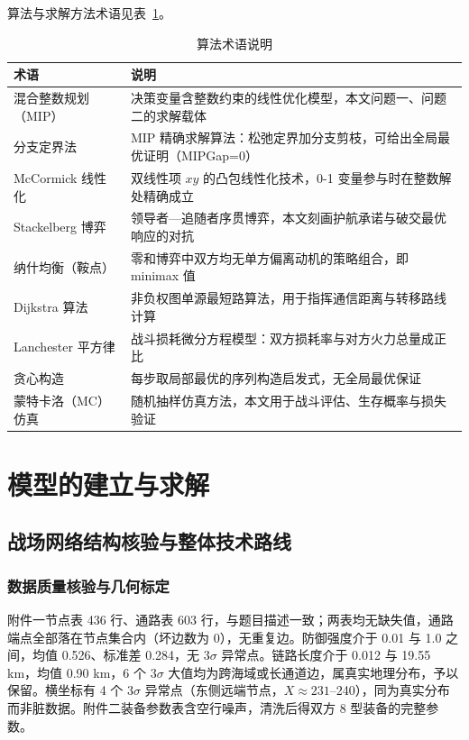 \documentclass[12pt,a4paper]{ctexart}
\begin{document}
算法与求解方法术语见表~\ref{tab:algo}。

\begin{table}[H]
\centering
\caption{算法术语说明}
\label{tab:algo}
\begin{tabular}{p{3.6cm}p{10.0cm}}
\toprule
术语 & 说明 \\
\midrule
混合整数规划（MIP） & 决策变量含整数约束的线性优化模型，本文问题一、问题二的求解载体 \\
分支定界法 & MIP 精确求解算法：松弛定界加分支剪枝，可给出全局最优证明（MIPGap=0） \\
McCormick 线性化 & 双线性项 $xy$ 的凸包线性化技术，0-1 变量参与时在整数解处精确成立 \\
Stackelberg 博弈 & 领导者—追随者序贯博弈，本文刻画护航承诺与破交最优响应的对抗 \\
纳什均衡（鞍点） & 零和博弈中双方均无单方偏离动机的策略组合，即 minimax 值 \\
Dijkstra 算法 & 非负权图单源最短路算法，用于指挥通信距离与转移路线计算 \\
Lanchester 平方律 & 战斗损耗微分方程模型：双方损耗率与对方火力总量成正比 \\
贪心构造 & 每步取局部最优的序列构造启发式，无全局最优保证 \\
蒙特卡洛（MC）仿真 & 随机抽样仿真方法，本文用于战斗评估、生存概率与损失验证 \\
\bottomrule
\end{tabular}
\end{table}

\section{模型的建立与求解}

\subsection{战场网络结构核验与整体技术路线}
\label{sec:global}

\subsubsection{数据质量核验与几何标定}

附件一节点表 436 行、通路表 603 行，与题目描述一致；两表均无缺失值，通路端点全部落在节点集合内（坏边数为 0），无重复边。防御强度介于 0.01 与 1.0 之间，均值 0.526、标准差 0.284，无 $3\sigma$ 异常点。链路长度介于 0.012 与 19.55 km，均值 0.90 km，6 个 $3\sigma$ 大值均为跨海域或长通道边，属真实地理分布，予以保留。横坐标有 4 个 $3\sigma$ 异常点（东侧远端节点，$X\approx 231$--240），同为真实分布而非脏数据。附件二装备参数表含空行噪声，清洗后得双方 8 型装备的完整参数。
\end{document}
